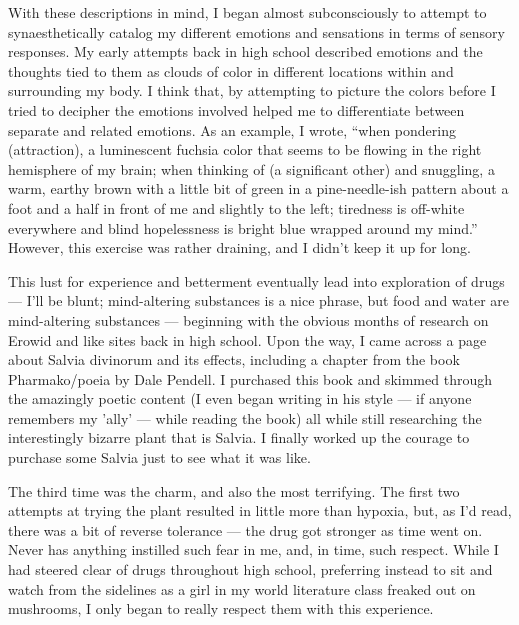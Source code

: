 \documentclass{book}
\begin{document}
With these descriptions in mind, I began almost subconsciously to
attempt to synaesthetically catalog my different emotions and sensations
in terms of sensory responses.  My early attempts back in high school
described emotions and the thoughts tied to them as clouds of color in
different locations within and surrounding my body.  I think that, by
attempting to picture the colors before I tried to decipher the emotions
involved helped me to differentiate between separate and related
emotions.  As an example, I wrote, ``when pondering (attraction), a
luminescent fuchsia color that seems to be flowing in the right
hemisphere of my brain; when thinking of (a significant other) and snuggling, a warm, earthy brown with a little bit of green in a pine-needle-ish pattern about a foot and a half in front of me and slightly to the left; tiredness is off-white everywhere and blind hopelessness is bright blue wrapped around my mind.'' However, this exercise was rather draining, and I didn't keep it up for long.

This lust for experience and betterment eventually lead into exploration of drugs --- I'll be blunt; mind-altering substances is a nice phrase, but food and water are mind-altering substances --- beginning with the obvious months of research on Erowid and like sites back in high school.  Upon the way, I came across a page about Salvia divinorum and its effects, including a chapter from the book Pharmako/poeia by Dale Pendell.  I purchased this book and skimmed through the amazingly poetic content (I even began writing in his style --- if anyone remembers my 'ally' --- while reading the book) all while still researching the interestingly bizarre plant that is Salvia.  I finally worked up the courage to purchase some Salvia just to see what it was like.

The third time was the charm, and also the most terrifying.  The first two attempts at trying the plant resulted in little more than hypoxia, but, as I'd read, there was a bit of reverse tolerance --- the drug got stronger as time went on.  Never has anything instilled such fear in me, and, in time, such respect.  While I had steered clear of drugs throughout high school, preferring instead to sit and watch from the sidelines as a girl in my world literature class freaked out on mushrooms, I only began to really respect them with this experience.
\end{document}
